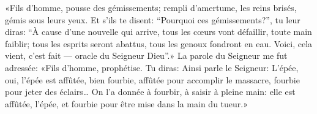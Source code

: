 «Fils d’homme, pousse des gémissements;
	rempli d’amertume, les reins brisés, gémis sous leurs yeux.
Et s’ils te disent: “Pourquoi ces gémissements?”,
	tu leur diras: “À cause d’une nouvelle qui arrive,
	tous les cœurs vont défaillir, toute main faiblir;
	tous les esprits seront abattus, tous les genoux fondront en eau.
Voici, cela vient, c’est fait --- oracle du Seigneur Dieu”.»
La parole du Seigneur me fut adressée:
	«Fils d’homme, prophétise. Tu diras: Ainsi parle le Seigneur:
	L’épée, oui, l’épée est affûtée, bien fourbie,
	affûtée pour accomplir le massacre, fourbie pour jeter des éclairs…
	On l’a donnée à fourbir, à saisir à pleine main:
	elle est affûtée, l’épée, et fourbie pour être mise dans la main du tueur.»
